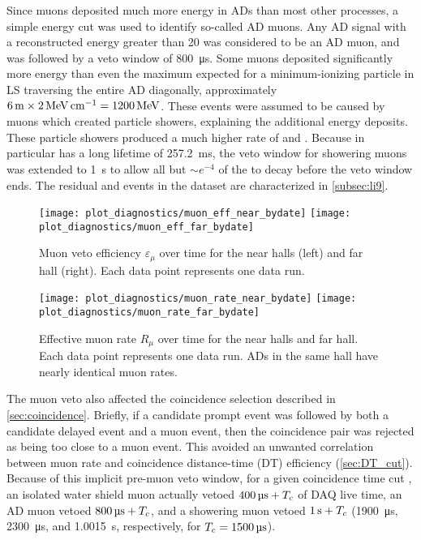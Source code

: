 Since muons deposited much more energy in ADs than most other processes,
a simple energy cut was used to identify so-called AD muons.
Any AD signal with a reconstructed energy greater than \SI{20}{\mev}
was considered to be an AD muon, and was followed by a veto window
of \SI{800}{\micro\second}.
Some muons deposited significantly more energy than
even the maximum expected for a minimum-ionizing particle in LS
traversing the entire AD diagonally, approximately
$\SI{6}{\meter}\times\SI{2}{\mev\per\cm}=\SI{1200}{\mev}$.
These events were assumed to be caused by muons which created particle showers,
explaining the additional energy deposits.
These particle showers produced a much higher rate of
\li{} and \he{}.
Because \li{} in particular has a long lifetime of \SI{257.2}{\milli\second},
the veto window for showering muons was extended to \SI{1}{\second}
to allow all but ${\sim}e^{-4}$ of the \li{} to decay before the veto window ends.
The residual \li{} and \he{} events in the dataset are characterized
in \cref{subsec:li9}.

\begin{figure}
    \centering
    \texttt{[image: plot\_diagnostics/muon\_eff\_near\_bydate]}
    \texttt{[image: plot\_diagnostics/muon\_eff\_far\_bydate]}
    \caption[Muon veto efficiency over time]{
        Muon veto efficiency $\varepsilon_\mu$ over time for
        the near halls (left) and far hall (right).
        Each data point represents one data run.
    }
    \label{fig:veto_eff}
\end{figure}

\begin{figure}
    \centering
    \texttt{[image: plot\_diagnostics/muon\_rate\_near\_bydate]}
    \texttt{[image: plot\_diagnostics/muon\_rate\_far\_bydate]}
    \caption[Effective muon rate over time]{
        Effective muon rate $R_\mu$ over time for the near halls and far hall.
        Each data point represents one data run.
        ADs in the same hall have nearly identical muon rates.
    }
    \label{fig:muon_rate}
\end{figure}

The muon veto also affected the coincidence selection
described in \cref{sec:coincidence}.
Briefly, if a candidate prompt event was followed
by both a candidate delayed event and a muon event,
then the coincidence pair was rejected as being too close to a muon event.
This avoided an unwanted correlation between muon rate
and coincidence distance-time (DT) efficiency (\cref{sec:DT_cut}).
Because of this implicit pre-muon veto window,
for a given coincidence time cut \tc,
an isolated water shield muon actually vetoed $\SI{400}{\micro\second}+T_c$
of DAQ live time,
an AD muon vetoed $\SI{800}{\micro\second}+T_c$,
and a showering muon vetoed $\SI{1}{\second}+T_c$
(\SI{1900}{\us}, \SI{2300}{\us}, and \SI{1.0015}{\s}, respectively,
for $\tc=\SI{1500}{\us}$).

